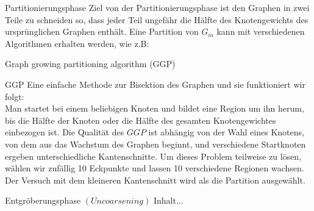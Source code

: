 \documentclass{beamer}
\begin{document}
\begin{frame}{Partitionierungsphase}
	Ziel von der Partitionierungsphase ist den Graphen in zwei Teile zu schneiden so, dass jeder Teil ungefähr die Hälfte des Knotengewichts des ursprünglichen Graphen enthält.
	Eine Partition von $G_m$ kann mit verschiedenen Algorithmen erhalten werden, wie z.B: 
	\begin{enumerate}
	\end{enumerate}
\end{frame}

\begin{frame}{Graph growing partitioning algorithm (GGP)}
	\begin{block}{GGP}
		Eine einfache Methode zur Bisektion des Graphen und sie funktioniert wir folgt:\\
		Man startet bei einem beliebigen Knoten und bildet eine Region um ihn herum, bis die Hälfte der Knoten oder die Hälfte des gesamten Knotengewichtes einbezogen ist. Die Qualität des $GGP$ ist abhängig von der Wahl eines Knotens, von dem aus das Wachstum des Graphen beginnt, und verschiedene Startknoten ergeben unterschiedliche Kantenschnitte.  
		Um dieses Problem teilweise zu lösen, wählen wir zufällig 10 Eckpunkte
		und lassen 10 verschiedene Regionen wachsen. Der Versuch mit dem kleineren Kantenschnitt wird als
		die Partition ausgewählt.
	\end{block}
\end{frame}


\begin{frame}{Entgröberungsphase $(Uncoarsening)$}
	Inhalt...
\end{frame}
\end{document}
